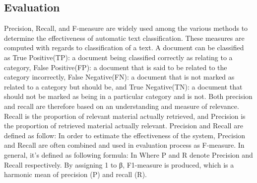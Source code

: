 \documentclass{sigchi}
\begin{document}
\subsection{Evaluation}
Precision, Recall, and F-measure are widely used among the various methods to determine the effectiveness of automatic text classification. 
These measures are computed with regards to classification of a text. 
A document can be classified~\cite{ikonomakis2005text} as True Positive(TP): a document being classified correctly as relating to a category, False Positive(FP): a document that is said to be related to the category incorrectly, False Negative(FN): a document that is not marked as related to a category but should be, and True Negative(TN): a document that should not be marked as being in a particular category and
is not.
Both precision and recall are therefore based on an understanding and measure of relevance. 
Recall is the proportion of relevant material actually retrieved, and Precision is the proportion of retrieved material actually relevant.
Precision and Recall are defined as follow:
In order to estimate the effectiveness of the system, Precision and Recall are often combined and used in evaluation process as F-measure. 
In general, it’s defined as following formula:
In Where P and R denote Precision and Recall respectively. 
By assigning 1 to β, F1-measure is produced, which is a harmonic mean of precision (P) and recall (R).
\end{document}
